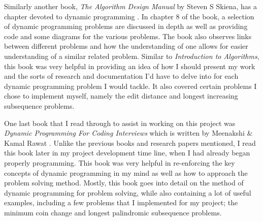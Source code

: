 Similarly another book, \textit{The Algorithm Design Manual} by Steven S Skiena, has a chapter devoted to dynamic programming \cite{design-manual}. In chapter 8 of the book, a selection of dynamic programming problems are discussed in depth as well as providing code and some diagrams for the various problems. The book also observes links between different problems and how the understanding of one allows for easier understanding of a similar related problem. Similar to \textit{Introduction to Algorithms}, this book was very helpful in providing an idea of how I should present my work and the sorts of research and documentation I'd have to delve into for each dynamic programming problem I would tackle. It also covered certain problems I chose to implement myself, namely the edit distance and longest increasing subsequence problems.
\smallbreak

One last book that I read through to assist in working on this project was \textit{Dynamic Programming For Coding Interviews} which is written by Meenakshi \& Kamal Rawat \cite{interviews}. Unlike the previous books and research papers mentioned, I read this book later in my project development time line, when I had already began properly programming. This book was very helpful in re-enforcing the key concepts of dynamic programming in my mind as well as how to approach the problem solving method. Mostly, this book goes into detail on the method of dynamic programming for problem solving, while also containing a lot of useful examples, including a few problems that I implemented for my project; the minimum coin change and longest palindromic subsequence problems.
